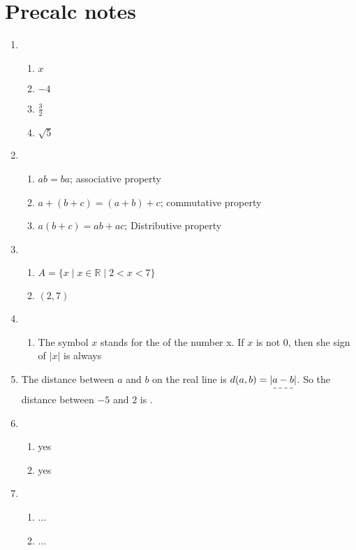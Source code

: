 \documentclass[12pt]{article}
\begin{document}
\section*{Precalc notes}

\begin{enumerate}
      \item \begin{enumerate}
                  \item $x$
                  \item $-4$
                  \item $\frac 3 2$
                  \item $\sqrt 5$
            \end{enumerate}
      \item \begin{enumerate}
                  \item $ab=ba$; associative property
                  \item $a + (b + c) = (a + b) + c$; commutative property
                  \item $a(b + c) = ab + ac$; Distributive property
            \end{enumerate}
      \item \begin{enumerate}
                  \item $A = \{x \mid x \in \mathbb{R} \mid 2 < x < 7 \}$
                  \item $(2,7)$
            \end{enumerate}
      \item
            \begin{enumerate}
                  \item The symbol $x$ stands for the  of the number x.
                        \newline If $x$ is not 0, then she sign of $|x|$ is always 
            \end{enumerate}
      \item The distance between $a$ and $b$ on the real line is $d(a,b) = \dashuline{|a-b|}$.
            \newline So the distance between $-5$ and $2$ is .
      \item \begin{enumerate}
                  \item yes
                  \item yes
            \end{enumerate}
      \item \begin{enumerate}
                  \item ...
                  \item ...
            \end{enumerate}
\end{enumerate}
\end{document}
